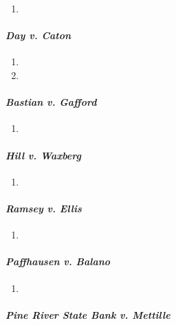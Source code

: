 \begin{enumerate}
    \item %
\end{enumerate}

\paragraph{\emph{Day v. Caton}}

\begin{enumerate}
    \item %
    \item %
\end{enumerate}

\paragraph{\emph{Bastian v. Gafford}}

\begin{enumerate}
    \item %
\end{enumerate}

\paragraph{\emph{Hill v. Waxberg}}

\begin{enumerate}
    \item %
\end{enumerate}

\paragraph{\emph{Ramsey v. Ellis}}

\begin{enumerate}
    \item %
\end{enumerate}

\paragraph{\emph{Paffhausen v. Balano}}

\begin{enumerate}
    \item %
\end{enumerate}

\paragraph{\emph{Pine River State Bank v. Mettille}}

